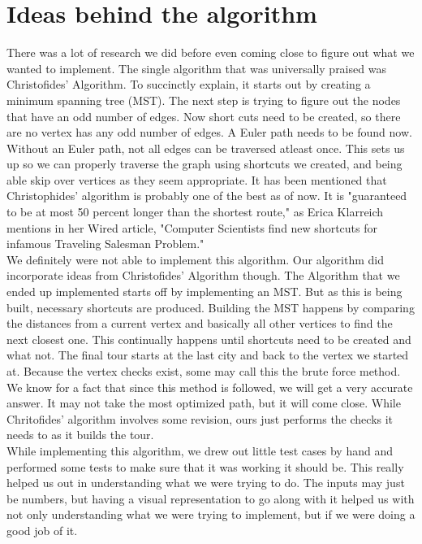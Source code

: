 \documentclass[11pt,letterpaper]{article}
\begin{document}
\section*{Ideas behind the algorithm}
There was a lot of research we did before even coming close to figure out what we wanted to implement. The single algorithm that was universally praised was Christofides' Algorithm. To succinctly explain, it starts out by creating a minimum spanning tree (MST). The next step is trying to figure out the nodes that have an odd number of edges. Now short cuts need to be created, so there are no vertex has any odd number of edges. A Euler path needs to be found now. Without an Euler path, not all edges can be traversed atleast once. This sets us up so we can properly traverse the graph using shortcuts we created, and being able skip over vertices as they seem appropriate. It has been mentioned that Christophides' algorithm is probably one of the best as of now. It is "guaranteed to be at most 50 percent longer than the shortest route," as Erica Klarreich mentions in her Wired article, "Computer Scientists find new shortcuts for infamous Traveling Salesman Problem."\\
We definitely were not able to implement this algorithm. Our algorithm did incorporate ideas from Christofides' Algorithm though. The Algorithm that we ended up implemented starts off by implementing an MST. But as this is being built, necessary shortcuts are produced. Building the MST happens by comparing the distances from a current vertex and basically all other vertices to find the next closest one. This continually happens until shortcuts need to be created and what not. The final tour starts at the last city and back to the vertex we started at. Because the vertex checks exist, some may call this the brute force method. We know for a fact that since this method is followed, we will get a very accurate answer. It may not take the most optimized path, but it will come close. While Chritofides' algorithm involves some revision, ours just performs the checks it needs to as it builds the tour.\\
While implementing this algorithm, we drew out little test cases by hand and performed some tests to make sure that it was working it should be. This really helped us out in understanding what we were trying to do. The inputs may just be numbers, but having a visual representation to go along with it helped us with not only understanding what we were trying to implement, but if we were doing a good job of it.
\end{document}
